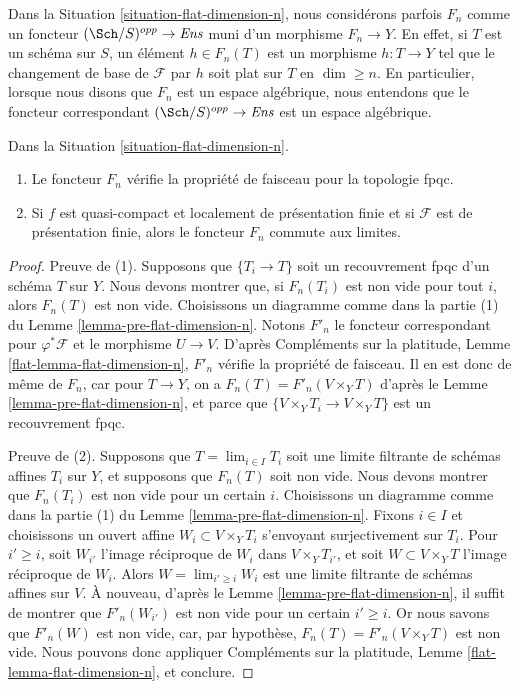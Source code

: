 \noindent
Dans la Situation \ref{situation-flat-dimension-n}, nous considérons parfois
$F_n$ comme un foncteur $(\Sch/S)^{opp} \to \textit{Ens}$ muni d'un morphisme
$F_n \to Y$. En effet, si $T$ est un schéma sur $S$,
un élément $h \in F_n(T)$ est un morphisme $h : T \to Y$
tel que le changement de base de $\mathcal{F}$ par $h$ soit plat sur $T$
en $\dim \geq n$. En particulier, lorsque nous disons
que $F_n$ est un espace algébrique, nous entendons que le foncteur
correspondant $(\Sch/S)^{opp} \to \textit{Ens}$ est un espace algébrique.

\begin{lemma}
\label{lemma-flat-dimension-n}
Dans la Situation \ref{situation-flat-dimension-n}.
\begin{enumerate}
\item Le foncteur $F_n$ vérifie la propriété de faisceau pour la topologie fpqc.
\item Si $f$ est quasi-compact et localement de présentation finie
et si $\mathcal{F}$ est de présentation finie, alors le foncteur $F_n$
commute aux limites.
\end{enumerate}
\end{lemma}

\begin{proof}
Preuve de (1). Supposons que $\{T_i \to T\}$ soit un recouvrement fpqc
d'un schéma $T$ sur $Y$. Nous devons montrer que, si $F_n(T_i)$ est non vide
pour tout $i$, alors $F_n(T)$ est non vide.
Choisissons un diagramme comme dans la partie (1) du Lemme \ref{lemma-pre-flat-dimension-n}.
Notons $F'_n$ le foncteur correspondant pour
$\varphi^*\mathcal{F}$ et le morphisme $U \to V$.
D'après Compléments sur la platitude, Lemme \ref{flat-lemma-flat-dimension-n},
$F'_n$ vérifie la propriété de faisceau.
Il en est donc de même de $F_n$, car
pour $T \to Y$, on a $F_n(T) = F'_n(V \times_Y T)$
d'après le Lemme \ref{lemma-pre-flat-dimension-n},
et parce que $\{V \times_Y T_i \to V \times_Y T\}$
est un recouvrement fpqc.

\medskip\noindent
Preuve de (2). Supposons que $T = \lim_{i \in I} T_i$ soit une limite filtrante
de schémas affines $T_i$ sur $Y$, et supposons que $F_n(T)$ soit non vide.
Nous devons montrer que $F_n(T_i)$ est non vide pour un certain $i$.
Choisissons un diagramme comme dans la
partie (1) du Lemme \ref{lemma-pre-flat-dimension-n}.
Fixons $i \in I$ et choisissons un ouvert affine $W_i \subset V \times_Y T_i$
s'envoyant surjectivement sur $T_i$. Pour $i' \geq i$, soit $W_{i'}$
l'image réciproque de $W_i$ dans $V \times_Y T_{i'}$, et
soit $W \subset V \times_Y T$ l'image réciproque de $W_i$.
Alors $W = \lim_{i' \geq i} W_i$ est une limite filtrante de schémas
affines sur $V$. À nouveau, d'après le
Lemme \ref{lemma-pre-flat-dimension-n},
il suffit de montrer que $F'_n(W_{i'})$ est non vide pour un certain
$i' \geq i$. Or nous savons que $F'_n(W)$ est non vide,
car, par hypothèse, $F_n(T) = F'_n(V \times_Y T)$
est non vide. Nous pouvons donc appliquer
Compléments sur la platitude, Lemme \ref{flat-lemma-flat-dimension-n},
et conclure.
\end{proof}

